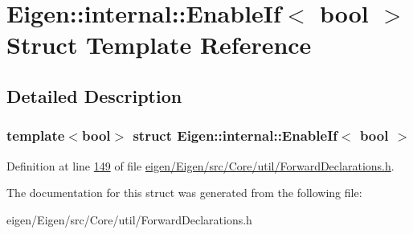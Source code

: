 \hypertarget{struct_eigen_1_1internal_1_1_enable_if}{}\section{Eigen\+:\+:internal\+:\+:Enable\+If$<$ bool $>$ Struct Template Reference}
\label{struct_eigen_1_1internal_1_1_enable_if}


\subsection{Detailed Description}
\subsubsection*{template$<$bool$>$\newline
struct Eigen\+::internal\+::\+Enable\+If$<$ bool $>$}



Definition at line \hyperlink{eigen_2_eigen_2src_2_core_2util_2_forward_declarations_8h_source_l00149}{149} of file \hyperlink{eigen_2_eigen_2src_2_core_2util_2_forward_declarations_8h_source}{eigen/\+Eigen/src/\+Core/util/\+Forward\+Declarations.\+h}.



The documentation for this struct was generated from the following file\+:\begin{DoxyCompactItemize}
\item 
eigen/\+Eigen/src/\+Core/util/\+Forward\+Declarations.\+h\end{DoxyCompactItemize}
